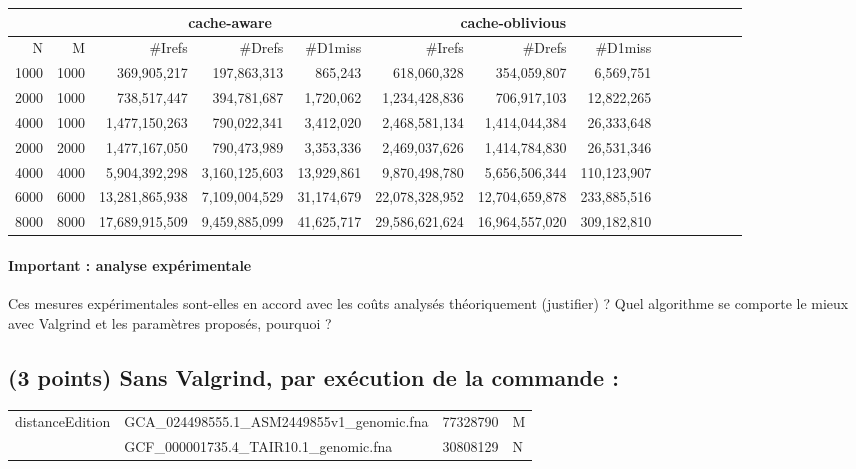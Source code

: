 \documentclass[10pt,a4paper]{article}
\begin{document}
\begin{tabular}{|r|r||r|r|r||r|r|r||r|r|r||r|r|r||}
  \hline
   \multicolumn{2}{|c||}{ }
   & \multicolumn{3}{c||}{cache-aware}
& \multicolumn{3}{c||}{cache-oblivious}
\\ \hline
N & M 

& \#Irefs & \#Drefs & \#D1miss %
& \#Irefs & \#Drefs & \#D1miss %
\\ \hline
\hline
1000 & 1000 
& 369,905,217 & 197,863,313 & 865,243  %
& 618,060,328 & 354,059,807 & 6,569,751  %
\\ \hline
2000 & 1000 

& 738,517,447 & 394,781,687 & 1,720,062  %
& 1,234,428,836 & 706,917,103  & 12,822,265   %
\\ \hline
4000 & 1000 
& 1,477,150,263 & 790,022,341  & 3,412,020   %
& 2,468,581,134 & 1,414,044,384 & 26,333,648   %
\\ \hline
2000 & 2000 
& 1,477,167,050 & 790,473,989 & 3,353,336   %
& 2,469,037,626 & 1,414,784,830 & 26,531,346  %
\\ \hline
4000 & 4000 

& 5,904,392,298 & 3,160,125,603  & 13,929,861 %
&  9,870,498,780 & 5,656,506,344 & 110,123,907  %
\\ \hline
6000 & 6000 

& 13,281,865,938 &  7,109,004,529 & 31,174,679  %
& 22,078,328,952 & 12,704,659,878  & 233,885,516  %
\\ \hline
8000 & 8000 

& 17,689,915,509 & 9,459,885,099 & 41,625,717  %
& 29,586,621,624 & 16,964,557,020 & 309,182,810  %
\\ \hline
\hline
\end{tabular}


\paragraph{Important : analyse expérimentale}
Ces mesures expérimentales sont-elles en accord avec les coûts analysés théoriquement (justifier) ? 
Quel algorithme se comporte le mieux avec Valgrind et les paramètres proposés, pourquoi ?

\subsection{(3 points) Sans Valgrind, par exécution de la commande :}
{\tt \begin{tabular}{llll}
distanceEdition & GCA\_024498555.1\_ASM2449855v1\_genomic.fna & 77328790 & M \\
                & GCF\_000001735.4\_TAIR10.1\_genomic.fna     & 30808129 & N
\end{tabular}}
\end{document}
